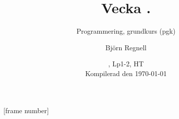 [frame number]



\title[Föreläsning i ''Programmering, grundkurs'', Björn Regnell, senast uppdaterad: \today]{Vecka \vecka. \veckotema}
\subtitle{Programmering, grundkurs (pgk)}
\author{Björn Regnell}
\date{\CourseCode, Lp1-2, HT\CurrentYear\\{\vspace{1em}\tiny Kompilerad den \today}}


